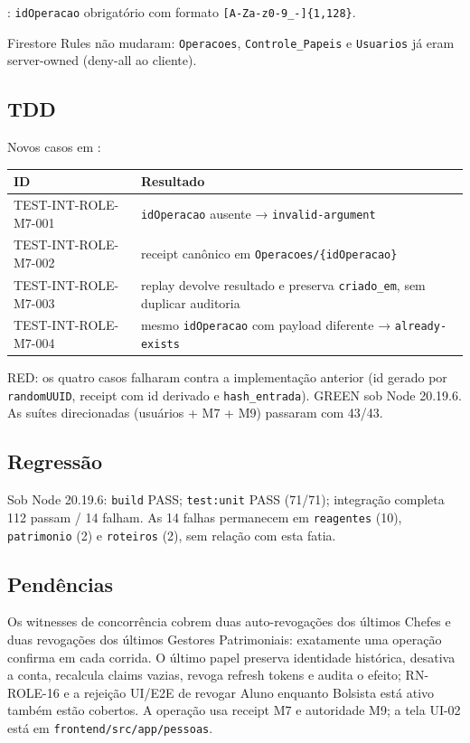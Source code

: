 : \texttt{idOperacao} obrigatório
com formato \texttt{[A-Za-z0-9\_-]\{1,128\}}.

Firestore Rules não mudaram: \texttt{Operacoes}, \texttt{Controle\_Papeis} e
\texttt{Usuarios} já eram server-owned (deny-all ao cliente).

\subsection{TDD}

Novos casos em :

\small
\begin{longtable}{@{}p{}p{}@{}}
\toprule
ID & Resultado \\
\midrule
\endhead
TEST-INT-ROLE-M7-001 & \texttt{idOperacao} ausente → \texttt{invalid-argument} \\
TEST-INT-ROLE-M7-002 & receipt canônico em \texttt{Operacoes/\{idOperacao\}} \\
TEST-INT-ROLE-M7-003 & replay devolve resultado e preserva \texttt{criado\_em}, sem duplicar auditoria \\
TEST-INT-ROLE-M7-004 & mesmo \texttt{idOperacao} com payload diferente → \texttt{already-exists} \\
\bottomrule
\end{longtable}
\normalsize

RED: os quatro casos falharam contra a implementação anterior (id gerado por
\texttt{randomUUID}, receipt com id derivado e \texttt{hash\_entrada}). GREEN sob
Node 20.19.6. As suítes direcionadas (usuários + M7 + M9) passaram com 43/43.

\subsection{Regressão}

Sob Node 20.19.6: \texttt{build} PASS; \texttt{test:unit} PASS (71/71);
integração completa 112 passam / 14 falham. As 14 falhas permanecem em
\texttt{reagentes} (10), \texttt{patrimonio} (2) e \texttt{roteiros} (2), sem
relação com esta fatia.

\subsection{Pendências}

Os witnesses de concorrência cobrem duas auto-revogações dos últimos Chefes e
duas revogações dos últimos Gestores Patrimoniais: exatamente uma operação
confirma em cada corrida. O último papel preserva identidade histórica,
desativa a conta, recalcula claims vazias, revoga refresh tokens e audita o
efeito; RN-ROLE-16 e a rejeição UI/E2E de revogar Aluno enquanto Bolsista está
ativo também estão cobertos. A operação usa receipt M7 e autoridade M9; a
tela UI-02 está em \texttt{frontend/src/app/pessoas}.

